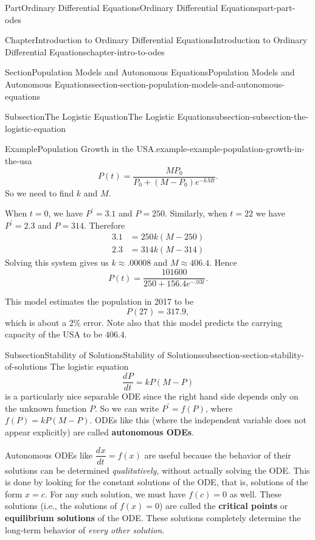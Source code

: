 \documentclass[twoside,10pt,]{book}
\newcommand{\terminology}[1]{\textbf{#1}}
\numberwithin{equation}{part}
\newcommand{\dv}[3][]{\dfrac{d^{#1} #2}{d #3^{#1}}}
\begin{document}
\begin{partptx}{Part}{Ordinary Differential Equations}{}{Ordinary Differential Equations}{}{}{part-part-odes}
\begin{chapterptx}{Chapter}{Introduction to Ordinary Differential Equations}{}{Introduction to Ordinary Differential Equations}{}{}{chapter-intro-to-odes}
\begin{sectionptx}{Section}{Population Models and Autonomous Equations}{}{Population Models and Autonomous Equations}{}{}{section-section-population-models-and-autonomous-equations}
\begin{subsectionptx}{Subsection}{The Logistic Equation}{}{The Logistic Equation}{}{}{subsection-subsection-the-logistic-equation}
\begin{example}{Example}{Population Growth in the USA.}{example-example-population-growth-in-the-usa}
\begin{equation*}
P(t) = \frac{MP_{0}}{P_{0} + (M - P_{0})e^{-kMt}}.
\end{equation*}
So we need to find \(k\) and \(M\).%
\par
When \(t = 0\), we have \(P^\prime = 3.1\) and \(P = 250\). Similarly, when \(t = 22\) we have \(P^\prime = 2.3\) and \(P = 314\). Therefore%
\begin{align*}
3.1 & = 250k(M - 250) \\
2.3 & = 314k(M - 314) 
\end{align*}
Solving this system gives us \(k\approx.00008\) and \(M \approx 406.4\). Hence%
\begin{equation*}
P(t) = \frac{101600}{250 + 156.4e^{-.03t}}.
\end{equation*}
%
\par
This model estimates the population in 2017 to be%
\begin{equation*}
P(27) = 317.9,
\end{equation*}
which is about a \(2\%\) error. Note also that this model predicts the carrying capacity of the USA to be \(406.4\).%
\end{example}
\end{subsectionptx}
%
%
\typeout{************************************************}
\typeout{************************************************}
%
\begin{subsectionptx}{Subsection}{Stability of Solutions}{}{Stability of Solutions}{}{}{subsection-section-stability-of-solutions}
The logistic equation%
\begin{equation*}
\dv{P}{t} = kP(M-P)
\end{equation*}
is a particularly nice separable ODE since the right hand side depends only on the unknown function \(P\). So we can write \(P^\prime = f(P)\), where \(f(P) = kP(M-P)\). ODEs like this (where the independent variable does not appear explicitly) are called \terminology{autonomous ODEs}.%
\par
Autonomous ODEs like \(\dv{x}{t} = f(x)\) are useful because the behavior of their solutions can be determined \emph{qualitatively}, without actually solving the ODE. This is done by looking for the constant solutions of the ODE, that is, solutions of the form \(x = c\). For any such solution, we must have \(f(c) = 0\) as well. These solutions (i.e., the solutions of \(f(x) = 0\)) are called the \terminology{critical points} or \terminology{equilibrium solutions} of the ODE. These solutions completely determine the long-term behavior of \emph{every other solution}.%

\end{subsectionptx}
\end{sectionptx}
\end{chapterptx}
\end{partptx}
\end{document}
